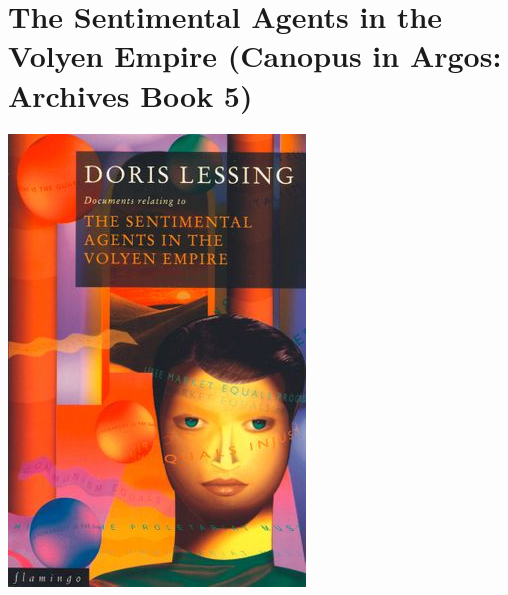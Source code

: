 \documentclass{tufte-handout}
\makeatletter
\newcommand{\varcaption}[2][0pt]{%
  \gsetlength{\@tufte@caption@vertical@offset}{-#1}%
  \gdef\@tufte@stored@varcaption{#2}%
}
\gdef\@tufte@stored@varcaption{} %
\makeatother
\begin{document}
\section*{The Sentimental Agents in the Volyen Empire (Canopus in Argos: Archives Book 5)}
\begin{marginfigure}[\baselineskip]
   \includegraphics[width=\linewidth]{images/sentimental_agents_in_the_volyen_empire.jpg}
   \varcaption{\href{https://www.harpercollins.co.uk/9780006547228/the-sentimental-agents-in-the-volyen-empire/}{Publisher Link}, \href{https://www.amazon.com/Sentimental-Agents-Volyen-Empire/dp/0006547222/}{Amazon Link}}
\end{marginfigure}
\end{document}
